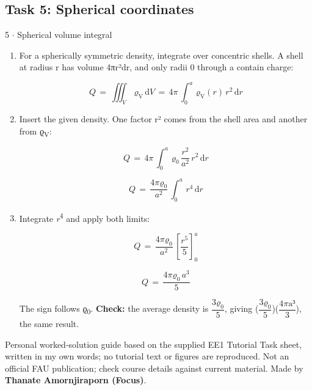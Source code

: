\documentclass[11pt]{article}
\begin{document}
\begin{keepsection}\subsection{Task 5: Spherical coordinates}

\begin{workedbox}{5 \ensuremath{\cdot} Spherical volume integral}
\begin{enumerate}
\item {}
For a spherically symmetric density, integrate over concentric shells. A shell at radius r has volume 4πr²dr, and only radii 0 through a contain charge:

\begin{equation*}{Q}\, =\, \iiint_{{V}} \, ϱ_{\mathrm{V}}\, \mathrm{d}{V}\, =\, 4π\, \int_{0}^{{a}} \, ϱ_{\mathrm{V}}({r})\, {r}^{2}\, \mathrm{d}{r}\end{equation*}
\item {}
Insert the given density. One factor r² comes from the shell area and another from ϱ\textsubscript{V}:

\begin{equation*}{Q}\, =\, 4π\, \int_{0}^{{a}} \, ϱ_{0}\, \dfrac{{r}^{2}}{{a}^{2}}\, {r}^{2}\, \mathrm{d}{r}\end{equation*}

\begin{equation*}{Q}\, =\, \dfrac{4πϱ_{0}}{{a}^{2}}\, \int_{0}^{{a}} \, {r}^{4}\, \mathrm{d}{r}\end{equation*}
\item {}
Integrate \textit{r}\textsuperscript{4} and apply both limits:

\begin{equation*}{Q}\, =\, \dfrac{4πϱ_{0}}{{a}^{2}}\, \left[\dfrac{{r}^{5}}{5}\right]_{0}^{{a}}\end{equation*}

\begin{equation*}{Q}\, =\, \dfrac{4πϱ_{0}\, {a}^{3}}{5}\end{equation*}

The sign follows ϱ\textsubscript{0}. \textbf{Check:} the average density is {\small\ensuremath{\dfrac{3ϱ_{0}}{5}}}, giving ({\small\ensuremath{\dfrac{3ϱ_{0}}{5}}})({\small\ensuremath{\dfrac{4π\mathrm{a}³}{3}}}), the same result.
\end{enumerate}
\end{workedbox}

\end{keepsection}

\vfill{\small Personal worked-solution guide based on the supplied EE1 Tutorial Task sheet, written in my own words; no tutorial text or figures are reproduced. Not an official FAU publication; check course details against current material. Made by \textbf{Thanate Amornjiraporn (Focus)}.}
\end{document}
